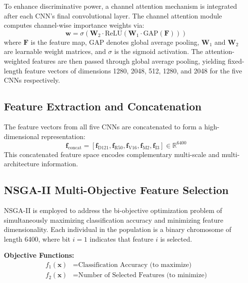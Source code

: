 \documentclass{article}
\begin{document}
To enhance discriminative power, a channel attention mechanism is integrated after each CNN's final convolutional layer. The channel attention module computes channel-wise importance weights via:
\begin{equation}
	\mathbf{w} = \sigma(\mathbf{W}_2 \cdot \text{ReLU}(\mathbf{W}_1 \cdot \text{GAP}(\mathbf{F})))
\end{equation}
where $\mathbf{F}$ is the feature map, GAP denotes global average pooling, $\mathbf{W}_1$ and $\mathbf{W}_2$ are learnable weight matrices, and $\sigma$ is the sigmoid activation. The attention-weighted features are then passed through global average pooling, yielding fixed-length feature vectors of dimensions 1280, 2048, 512, 1280, and 2048 for the five CNNs respectively.

\subsection{Feature Extraction and Concatenation}

The feature vectors from all five CNNs are concatenated to form a high-dimensional representation:
\begin{equation}
	\mathbf{f}_{\text{concat}} = [\mathbf{f}_{\text{D121}}, \mathbf{f}_{\text{R50}}, \mathbf{f}_{\text{V16}}, \mathbf{f}_{\text{M2}}, \mathbf{f}_{\text{I3}}] \in \mathbb{R}^{6400}
\end{equation}
This concatenated feature space encodes complementary multi-scale and multi-architecture information.

\subsection{NSGA-II Multi-Objective Feature Selection}

NSGA-II is employed to address the bi-objective optimization problem of simultaneously maximizing classification accuracy and minimizing feature dimensionality. Each individual in the population is a binary chromosome of length 6400, where bit $i=1$ indicates that feature $i$ is selected.

\textbf{Objective Functions:}
\begin{align}
	f_1(\mathbf{x}) &= \text{Classification Accuracy (to maximize)} \\
	f_2(\mathbf{x}) &= \text{Number of Selected Features (to minimize)}
\end{align}
\end{document}
